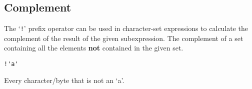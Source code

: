 
\subsection{Complement}
{
	The `\texttt{!}' prefix operator can be used in character-set expressions
	to calculate the complement of the result of the given subexpression. The
	complement of a set containing all the elements \textbf{not} contained in
	the given set.
	
	\begin{itemize}
	{
		\item[] \lstinline[language=MAIA, columns=fixed]@!'a'@
		
			Every character/byte that is not an `a'.
	}
	\end{itemize}
}
